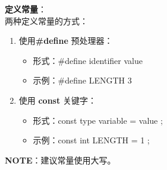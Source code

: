 \documentclass[UTF8]{ctexart}
\begin{document}
	\textbf{定义常量}：\\ 两种定义常量的方式：\begin{enumerate}
		\item 使用\textbf{\#define} 预处理器：\begin{itemize}
			\item 形式：\#define identifier value
			\item 示例：\#define LENGTH 3
		\end{itemize}
		\item 使用 \textbf{const} 关键字：\begin{itemize}
			\item 形式：const type variable = value ;
			\item 示例：const int LENGTH = 1 ;
		\end{itemize}
	\end{enumerate}
	\textbf{NOTE}：建议常量使用大写。
\end{document}
